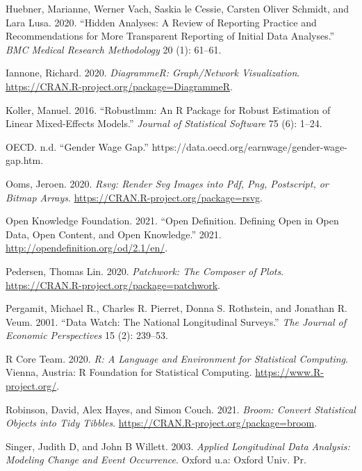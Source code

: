 \documentclass{article}
\begin{document}
\leavevmode\hypertarget{ref-HuebnerMarianne2020Haar}{}%
Huebner, Marianne, Werner Vach, Saskia le Cessie, Carsten Oliver Schmidt, and Lara Lusa. 2020. ``Hidden Analyses: A Review of Reporting Practice and Recommendations for More Transparent Reporting of Initial Data Analyses.'' \emph{BMC Medical Research Methodology} 20 (1): 61--61.

\leavevmode\hypertarget{ref-DiagrammeR}{}%
Iannone, Richard. 2020. \emph{DiagrammeR: Graph/Network Visualization}. \url{https://CRAN.R-project.org/package=DiagrammeR}.

\leavevmode\hypertarget{ref-KollerManuel2016rARP}{}%
Koller, Manuel. 2016. ``Robustlmm: An R Package for Robust Estimation of Linear Mixed-Effects Models.'' \emph{Journal of Statistical Software} 75 (6): 1--24.

\leavevmode\hypertarget{ref-OECD}{}%
OECD. n.d. ``Gender Wage Gap.'' https://data.oecd.org/earnwage/gender-wage-gap.htm.

\leavevmode\hypertarget{ref-rsvg}{}%
Ooms, Jeroen. 2020. \emph{Rsvg: Render Svg Images into Pdf, Png, Postscript, or Bitmap Arrays}. \url{https://CRAN.R-project.org/package=rsvg}.

\leavevmode\hypertarget{ref-opendata}{}%
Open Knowledge Foundation. 2021. ``Open Definition. Defining Open in Open Data, Open Content, and Open Knowledge.'' 2021. \url{http://opendefinition.org/od/2.1/en/}.

\leavevmode\hypertarget{ref-patchwork}{}%
Pedersen, Thomas Lin. 2020. \emph{Patchwork: The Composer of Plots}. \url{https://CRAN.R-project.org/package=patchwork}.

\leavevmode\hypertarget{ref-MichaelRPergamit2001DWTN}{}%
Pergamit, Michael R., Charles R. Pierret, Donna S. Rothstein, and Jonathan R. Veum. 2001. ``Data Watch: The National Longitudinal Surveys.'' \emph{The Journal of Economic Perspectives} 15 (2): 239--53.

\leavevmode\hypertarget{ref-R}{}%
R Core Team. 2020. \emph{R: A Language and Environment for Statistical Computing}. Vienna, Austria: R Foundation for Statistical Computing. \url{https://www.R-project.org/}.

\leavevmode\hypertarget{ref-broom}{}%
Robinson, David, Alex Hayes, and Simon Couch. 2021. \emph{Broom: Convert Statistical Objects into Tidy Tibbles}. \url{https://CRAN.R-project.org/package=broom}.

\leavevmode\hypertarget{ref-SingerJudithD2003Alda}{}%
Singer, Judith D, and John B Willett. 2003. \emph{Applied Longitudinal Data Analysis: Modeling Change and Event Occurrence}. Oxford u.a: Oxford Univ. Pr.
\end{document}
